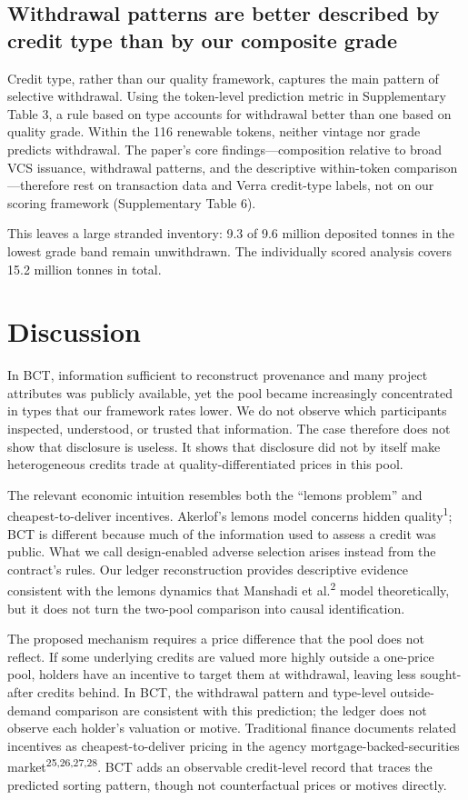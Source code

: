 \documentclass[sn-nature,Numbered]{sn-jnl}
\begin{document}
\subsection*{Withdrawal patterns are better described by credit type than by our composite grade}

Credit type, rather than our quality framework, captures the main pattern of selective withdrawal. Using the token-level prediction metric in Supplementary Table 3, a rule based on type accounts for withdrawal better than one based on quality grade. Within the 116 renewable tokens, neither vintage nor grade predicts withdrawal. The paper's core findings---composition relative to broad VCS issuance, withdrawal patterns, and the descriptive within-token comparison---therefore rest on transaction data and Verra credit-type labels, not on our scoring framework (Supplementary Table 6).

This leaves a large stranded inventory: 9.3 of 9.6 million deposited tonnes in the lowest grade band remain unwithdrawn. The individually scored analysis covers 15.2 million tonnes in total.

\section*{Discussion}
In BCT, information sufficient to reconstruct provenance and many project attributes was publicly available, yet the pool became increasingly concentrated in types that our framework rates lower. We do not observe which participants inspected, understood, or trusted that information. The case therefore does not show that disclosure is useless. It shows that disclosure did not by itself make heterogeneous credits trade at quality-differentiated prices in this pool.

The relevant economic intuition resembles both the ``lemons problem'' and cheapest-to-deliver incentives. Akerlof's lemons model concerns hidden quality\textsuperscript{1}; BCT is different because much of the information used to assess a credit was public. What we call design-enabled adverse selection arises instead from the contract's rules. Our ledger reconstruction provides descriptive evidence consistent with the lemons dynamics that Manshadi et al.\textsuperscript{2} model theoretically, but it does not turn the two-pool comparison into causal identification.

The proposed mechanism requires a price difference that the pool does not reflect. If some underlying credits are valued more highly outside a one-price pool, holders have an incentive to target them at withdrawal, leaving less sought-after credits behind. In BCT, the withdrawal pattern and type-level outside-demand comparison are consistent with this prediction; the ledger does not observe each holder's valuation or motive. Traditional finance documents related incentives as cheapest-to-deliver pricing in the agency mortgage-backed-securities market\textsuperscript{25,26,27,28}. BCT adds an observable credit-level record that traces the predicted sorting pattern, though not counterfactual prices or motives directly.
\end{document}
